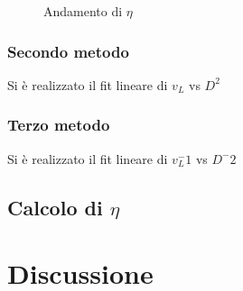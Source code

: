 \documentclass[a4paper,11pt,oneside]{article}
\begin{document}
\begin{figure}[h!]
    \centering
    \caption{Andamento di $\eta$}
    \label{fig:eta}
\end{figure}

\subsubsection{Secondo metodo}
Si è realizzato il fit lineare di $v_L$ vs $D^2$

\subsubsection{Terzo metodo}
Si è realizzato il fit lineare di $v_L^-1$ vs $D^-2$




\subsection{Calcolo di $\eta$}






\section{Discussione}
\end{document}
